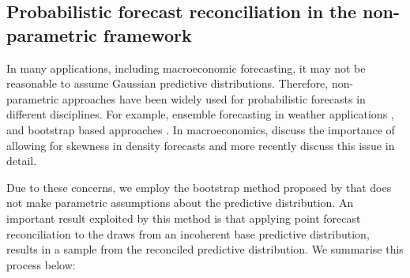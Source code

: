 \documentclass[a4paper, 11pt]{article}
\begin{document}
\subsection{Probabilistic forecast reconciliation in the non-parametric framework}\label{sec:probrecnp}

In many applications, including macroeconomic forecasting, it may not be reasonable to assume Gaussian predictive distributions. Therefore, non-parametric approaches have been widely used for probabilistic forecasts in different disciplines. For example, ensemble forecasting in weather applications \citep{GneRaf2005,Gneiting2014,Gneiting2008}, and bootstrap based approaches \citep{Manzan2008,Vilar2013}. In macroeconomics, \citet{CogEtAl2005} discuss the importance of allowing for skewness in density forecasts and more recently \citet{SmiVah2016} discuss this issue in detail.

Due to these concerns, we employ the bootstrap method proposed by \citet{GamEtAl2018} that does not make parametric assumptions about the predictive distribution. An important result exploited by this method is that applying point forecast reconciliation to the draws from an incoherent base predictive distribution, results in a sample from the reconciled predictive distribution. We summarise this process below:
\end{document}

